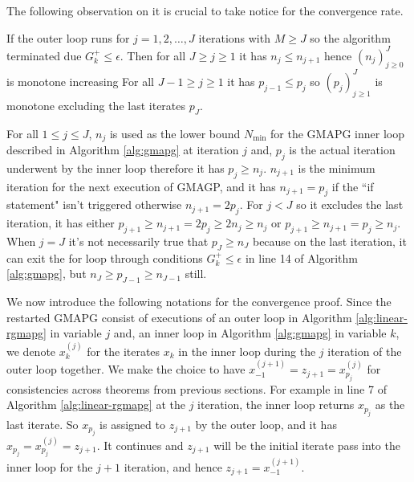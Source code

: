 \documentclass[12pt]{report}
\begin{document}
        The following observation on it is crucial to take notice for the convergence rate. 
        \begin{observation}\label{obs:rgmapg}
            If the outer loop runs for $j = 1, 2, \ldots, J$ iterations with $M \ge J$ so the algorithm terminated due $G_k^+ \le \epsilon$. 
            Then for all $J\ge j\ge 1$ it has $n_{j}\le n_{j + 1}$ hence $(n_j)_{j \ge 0}^J$ is monotone increasing
            For all $J -1 \ge j \ge 1 $ it has $p_{j-1}\le p_{j}$ so $(p_j)_{j \ge 1}^{J}$ is monotone excluding the last iterates $p_J$. 
        \end{observation}
        \par
        For all $1 \le j \le J$, $n_j$ is used as the lower bound $N_{\min}$ for the GMAPG inner loop described in Algorithm \ref{alg:gmapg} at iteration $j$ and, $p_j$ is the actual iteration underwent by the inner loop therefore it has $p_j \ge n_{j}$. 
        $n_{j + 1}$ is the minimum iteration for the next execution of GMAGP, and it has $n_{j + 1} = p_{j}$  if the ``if statement" isn't triggered otherwise $n_{j + 1} = 2p_{j}$. 
        For $j < J$ so it excludes the last iteration, it has either $p_{j + 1} \ge n_{j + 1} = 2p_j \ge 2n_{j} \ge n_j$ or $p_{j + 1} \ge n_{j + 1} = p_j \ge n_j$. 
        When $j = J$ it's not necessarily true that $p_J \ge n_J$ because on the last iteration, it can exit the for loop through conditions $G_k^+ \le \epsilon$ in line 14 of Algorithm \ref{alg:gmapg}, but $n_J \ge p_{J - 1} \ge n_{J - 1}$ still. 
        \par
        We now introduce the following notations for the convergence proof. 
        Since the restarted GMAPG consist of executions of an outer loop in Algorithm \ref{alg:linear-rgmapg} in variable $j$ and, an inner loop in Algorithm \ref{alg:gmapg} in variable $k$, we denote $x_{k}^{(j)}$ for the iterates $x_k$ in the inner loop during the $j$ iteration of the outer loop together. 
        We make the choice to have $x_{-1}^{(j + 1)} = z_{j + 1} = x_{p_j}^{(j)}$ for consistencies across theorems from previous sections. 
        For example in line 7 of Algorithm \ref{alg:linear-rgmapg} at the $j$ iteration, the inner loop returns $x_{p_j}$ as the last iterate. 
        So $x_{p_j}$ is assigned to $z_{j + 1}$ by the outer loop, and it has $x_{p_j} = x_{p_j}^{(j)} = z_{j + 1}$. 
        It continues and $z_{j + 1}$ will be the initial iterate pass into the inner loop for the $j + 1$ iteration, and hence $z_{j + 1} =x_{-1}^{(j + 1)}$. 
        \par
\end{document}
